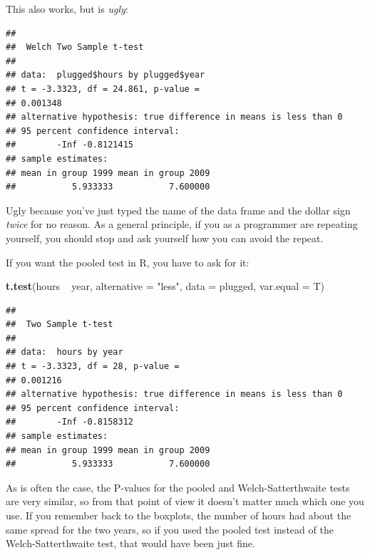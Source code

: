 \documentclass[]{tufte-book}
\newenvironment{Shaded}{}{}
\newcommand{\DataTypeTok}[1]{\textcolor[rgb]{0.56,0.13,0.00}{#1}}
\newcommand{\KeywordTok}[1]{\textcolor[rgb]{0.00,0.44,0.13}{\textbf{#1}}}
\newcommand{\NormalTok}[1]{#1}
\newcommand{\OperatorTok}[1]{\textcolor[rgb]{0.40,0.40,0.40}{#1}}
\newcommand{\StringTok}[1]{\textcolor[rgb]{0.25,0.44,0.63}{#1}}
\theoremstyle{definition}
\theoremstyle{definition}
\theoremstyle{definition}
\theoremstyle{remark}
\begin{document}
This also works, but is \emph{ugly}:

\begin{Shaded}
\end{Shaded}

\begin{verbatim}
## 
##  Welch Two Sample t-test
## 
## data:  plugged$hours by plugged$year
## t = -3.3323, df = 24.861, p-value =
## 0.001348
## alternative hypothesis: true difference in means is less than 0
## 95 percent confidence interval:
##        -Inf -0.8121415
## sample estimates:
## mean in group 1999 mean in group 2009 
##           5.933333           7.600000
\end{verbatim}

Ugly because you've just typed the name of the data frame and the dollar
sign \emph{twice} for no reason. As a general principle, if you as a
programmer are repeating yourself, you should stop and ask yourself how
you can avoid the repeat.

If you want the pooled test in R, you have to ask for it:

\begin{Shaded}
\begin{Highlighting}[]
\KeywordTok{t.test}\NormalTok{(hours }\OperatorTok{~}\StringTok{ }\NormalTok{year, }\DataTypeTok{alternative =} \StringTok{"less"}\NormalTok{, }\DataTypeTok{data =}\NormalTok{ plugged, }
    \DataTypeTok{var.equal =}\NormalTok{ T)}
\end{Highlighting}
\end{Shaded}

\begin{verbatim}
## 
##  Two Sample t-test
## 
## data:  hours by year
## t = -3.3323, df = 28, p-value =
## 0.001216
## alternative hypothesis: true difference in means is less than 0
## 95 percent confidence interval:
##        -Inf -0.8158312
## sample estimates:
## mean in group 1999 mean in group 2009 
##           5.933333           7.600000
\end{verbatim}

As is often the case, the P-values for the pooled and
Welch-Satterthwaite tests are very similar, so from that point of view
it doesn't matter much which one you use. If you remember back to the
boxplots, the number of hours had about the same spread for the two
years, so if you used the pooled test instead of the Welch-Satterthwaite
test, that would have been just fine.
\end{document}
